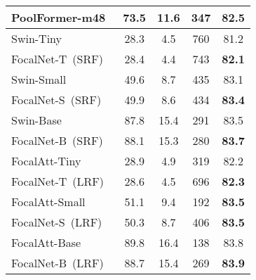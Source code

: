\documentclass{article}
\begin{document}
\begin{table}[t!]
\begin{minipage}{0.48\linewidth}
{\begin{tabular}{l|cccc}
    PoolFormer-m48~\cite{yu2021metaformer} & 73.5 & 11.6 & 347 & 82.5 \\
    \midrule
    Swin-Tiny~\cite{liu2021swin}   & 28.3 & 4.5 & 760 & 81.2 \\
    \rowcolor{Gray}
    FocalNet-T~(SRF)               & 28.4 & 4.4 & 743 & \textbf{82.1} \\
    Swin-Small~\cite{liu2021swin}    &  49.6 & 8.7 & 435 & 83.1 \\    
    \rowcolor{Gray}
    FocalNet-S~(SRF)               & 49.9 & 8.6 & 434 & \textbf{83.4} \\
    Swin-Base~\cite{liu2021swin}  & 87.8 & 15.4 & 291 & 83.5 \\  
    \rowcolor{Gray}
    FocalNet-B~(SRF) & 88.1 & 15.3 & 280 & \textbf{83.7} \\
    \hline
    FocalAtt-Tiny~\cite{yang2021focal} & 28.9 & 4.9 & 319 & {82.2} \\
    \rowcolor{Gray}
    FocalNet-T~(LRF)    & 28.6 & 4.5 & 696 & \textbf{82.3}  \\
    FocalAtt-Small & 51.1 & 9.4 & 192 & \textbf{83.5} \\
    \rowcolor{Gray}
    FocalNet-S~(LRF) & 50.3 & 8.7 & 406 & \textbf{83.5} \\   
    FocalAtt-Base~\cite{yang2021focal}  & 89.8 & 16.4 & 138 & 83.8 \\
    \rowcolor{Gray}
    FocalNet-B~(LRF)  &  88.7 & 15.4 & 269 & \textbf{83.9} \\
\bottomrule
    \end{tabular}
    
}
\end{minipage}
\end{table}
\end{document}
